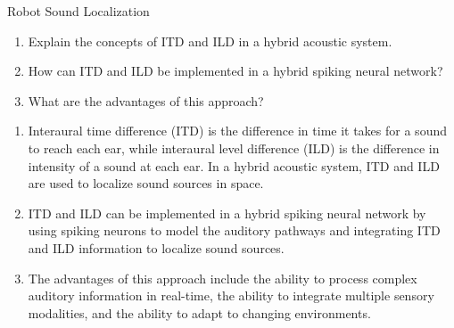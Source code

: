 \documentclass{article}
\begin{document}
\begin{exercise}{Robot Sound Localization}
  \begin{enumerate}
    \item Explain the concepts of ITD and ILD in a hybrid acoustic system.
    \item How can ITD and ILD be implemented in a hybrid spiking neural network?
    \item What are the advantages of this approach?
  \end{enumerate}

  \begin{solution}
    \begin{enumerate}
      \item Interaural time difference (ITD) is the difference in time it takes for a sound to reach each ear, while interaural level difference (ILD) is the difference in intensity of a sound at each ear. In a hybrid acoustic system, ITD and ILD are used to localize sound sources in space.
      \item ITD and ILD can be implemented in a hybrid spiking neural network by using spiking neurons to model the auditory pathways and integrating ITD and ILD information to localize sound sources.
      \item The advantages of this approach include the ability to process complex auditory information in real-time, the ability to integrate multiple sensory modalities, and the ability to adapt to changing environments.
    \end{enumerate}
  \end{solution}
\end{exercise}
\end{document}
